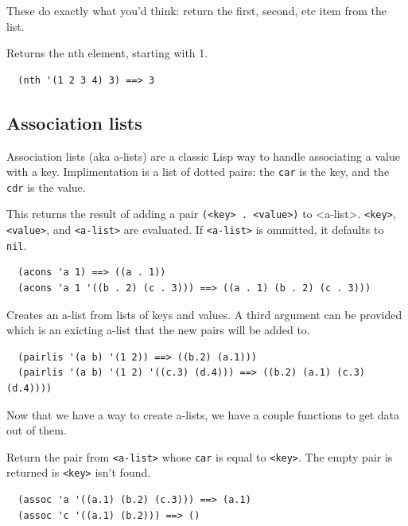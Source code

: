 \documentclass[12pt]{article}
\begin{document}
These do exactly what you'd think: return the first, second, etc item
from the list.


Returns the nth element, starting with 1.

\begin{verbatim}
  (nth '(1 2 3 4) 3) ==> 3
\end{verbatim}

\subsection{Association lists}

Association lists (aka a-lists) are a classic Lisp way to handle associating a value
with a key. Implimentation is a list of dotted pairs: the \verb|car|
is the key, and the \verb|cdr| is the value.


This returns the result of adding a pair \verb|(<key> . <value>)| to
<a-list>. \verb|<key>|, \verb|<value>|, and \verb|<a-list>| are
evaluated. If \verb|<a-list>| is ommitted, it defaults to \verb|nil|.

\begin{verbatim}
  (acons 'a 1) ==> ((a . 1))
  (acons 'a 1 '((b . 2) (c . 3))) ==> ((a . 1) (b . 2) (c . 3)))
\end{verbatim}


Creates an a-list from lists of keys and values. A third argument can
be provided which is an exicting a-list that the new pairs will be
added to.

\begin{verbatim}
  (pairlis '(a b) '(1 2)) ==> ((b.2) (a.1)))
  (pairlis '(a b) '(1 2) '((c.3) (d.4))) ==> ((b.2) (a.1) (c.3) (d.4))))
\end{verbatim}

Now that we have a way to create a-lists, we have a couple functions
to get data out of them.\\


Return the pair from \verb|<a-list>| whose \verb|car| is equal to
\verb|<key>|. The empty pair is returned is \verb|<key>| isn't found.

\begin{verbatim}
  (assoc 'a '((a.1) (b.2) (c.3))) ==> (a.1)
  (assoc 'c '((a.1) (b.2))) ==> ()
\end{verbatim}
\end{document}
